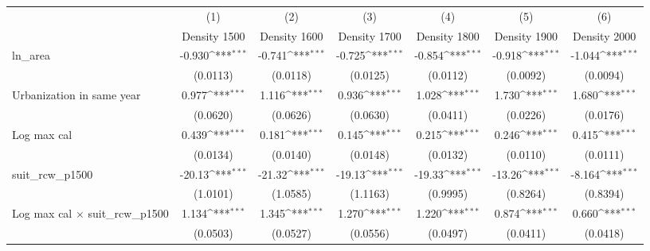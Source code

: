 {
\def\sym#1{\ifmmode^{#1}\else\(^{#1}\)\fi}
\begin{tabular}{l*{6}{c}}
\toprule
                    &\multicolumn{1}{c}{(1)}&\multicolumn{1}{c}{(2)}&\multicolumn{1}{c}{(3)}&\multicolumn{1}{c}{(4)}&\multicolumn{1}{c}{(5)}&\multicolumn{1}{c}{(6)}\\
                    &\multicolumn{1}{c}{Density 1500}&\multicolumn{1}{c}{Density 1600}&\multicolumn{1}{c}{Density 1700}&\multicolumn{1}{c}{Density 1800}&\multicolumn{1}{c}{Density 1900}&\multicolumn{1}{c}{Density 2000}\\
\midrule
ln\_area             &      -0.930\sym{***}&      -0.741\sym{***}&      -0.725\sym{***}&      -0.854\sym{***}&      -0.918\sym{***}&      -1.044\sym{***}\\
                    &    (0.0113)         &    (0.0118)         &    (0.0125)         &    (0.0112)         &    (0.0092)         &    (0.0094)         \\
\addlinespace
Urbanization in same year&       0.977\sym{***}&       1.116\sym{***}&       0.936\sym{***}&       1.028\sym{***}&       1.730\sym{***}&       1.680\sym{***}\\
                    &    (0.0620)         &    (0.0626)         &    (0.0630)         &    (0.0411)         &    (0.0226)         &    (0.0176)         \\
\addlinespace
Log max cal         &       0.439\sym{***}&       0.181\sym{***}&       0.145\sym{***}&       0.215\sym{***}&       0.246\sym{***}&       0.415\sym{***}\\
                    &    (0.0134)         &    (0.0140)         &    (0.0148)         &    (0.0132)         &    (0.0110)         &    (0.0111)         \\
\addlinespace
suit\_rcw\_p1500      &      -20.13\sym{***}&      -21.32\sym{***}&      -19.13\sym{***}&      -19.33\sym{***}&      -13.26\sym{***}&      -8.164\sym{***}\\
                    &    (1.0101)         &    (1.0585)         &    (1.1163)         &    (0.9995)         &    (0.8264)         &    (0.8394)         \\
\addlinespace
Log max cal $\times$ suit\_rcw\_p1500&       1.134\sym{***}&       1.345\sym{***}&       1.270\sym{***}&       1.220\sym{***}&       0.874\sym{***}&       0.660\sym{***}\\
                    &    (0.0503)         &    (0.0527)         &    (0.0556)         &    (0.0497)         &    (0.0411)         &    (0.0418)         \\

\end{tabular}}
